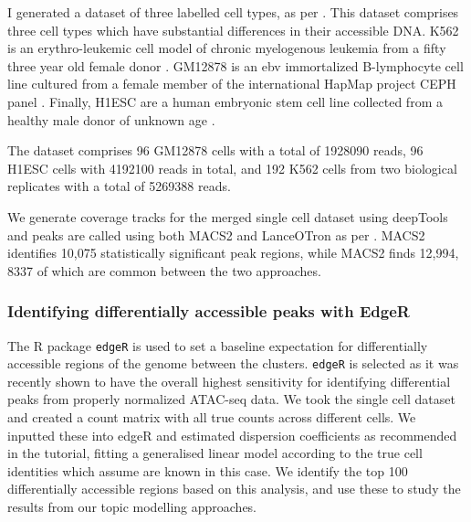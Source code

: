 I generated a dataset of three labelled cell types, as per . This dataset comprises three cell types which have substantial differences in their accessible DNA.  K562 is an erythro-leukemic cell model of chronic myelogenous leukemia from a fifty three year old female donor \cite{Lozzio1975}. GM12878 is an \gls{ebv} immortalized B-lymphocyte cell line cultured from a female member of the international HapMap project CEPH panel \cite{Belmont2005}. Finally, H1ESC are a human embryonic stem cell line collected from a healthy male donor of unknown age \cite{Thomson1998}. 

The dataset comprises 96 GM12878 cells with a total of 1928090 reads, 96 H1ESC cells with 4192100 reads in total, and 192 K562 cells from two biological replicates with a total of 5269388 reads.

We generate coverage tracks for the merged single cell dataset using deepTools and peaks are called using both MACS2 and LanceOTron as per  \cite{Ramirez2014}. MACS2 identifies 10,075 statistically significant peak regions, while MACS2 finds 12,994, 8337 of which are common between the two approaches.  

\subsubsection{Identifying differentially accessible peaks with EdgeR} \label{ch4:edgeR}

The R package {\tt edgeR} is used to set a baseline expectation for differentially accessible regions of the genome between the clusters. {\tt edgeR} is selected as it was recently shown to have the overall highest sensitivity for identifying differential peaks from properly normalized ATAC-seq data. We took the single cell dataset and created a count matrix with all true counts across different cells. We inputted these into edgeR and estimated dispersion coefficients as recommended in the tutorial, fitting a generalised linear model according to the true cell identities which assume are known in this case. We identify the top 100 differentially accessible regions based on this analysis, and use these to study the results from our topic modelling approaches.

